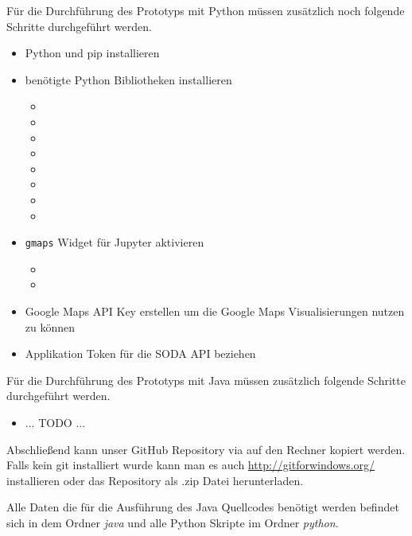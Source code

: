 Für die Durchführung des Prototyps mit Python müssen zusätzlich noch folgende Schritte durchgeführt werden.
\begin{itemize}
  \item Python und pip installieren\autocite{Python}
  \item benötigte Python Bibliotheken installieren
  \begin{itemize}
    \item {}
    \item {}
    \item {}
    \item {}
    \item {}
    \item {}
    \item {}
    \item {}
  \end{itemize}
  \item \texttt{gmaps} Widget für Jupyter aktivieren
  \begin{itemize}
    \item {}
    \item {}
  \end{itemize}
  \item Google Maps API Key erstellen um die Google Maps Visualisierungen nutzen zu können
  \item Applikation Token für die \ac{SODA} \ac{API} beziehen\autocite{AppToken}
\end{itemize}

Für die Durchführung des Prototyps mit Java müssen zusätzlich folgende Schritte durchgeführt werden.
\begin{itemize}
  \item ... TODO ...
\end{itemize}

Abschließend kann unser GitHub Repository via 
auf den Rechner kopiert werden.
Falls kein git installiert wurde kann man es auch \hyperref[hier]{http://gitforwindows.org/} installieren oder das Repository als .zip Datei herunterladen.

Alle Daten die für die Ausführung des Java Quellcodes benötigt werden befindet sich in dem Ordner \textit{java}
und alle Python Skripte im Ordner \textit{python}.

